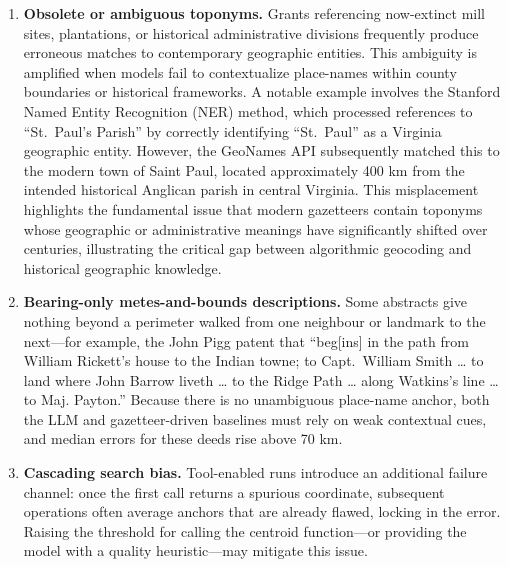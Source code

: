 \begin{enumerate}
\def\labelenumi{\arabic{enumi}.}
\item
  \textbf{Obsolete or ambiguous toponyms.} Grants referencing
  now-extinct mill sites, plantations, or historical administrative
  divisions frequently produce erroneous matches to contemporary
  geographic entities. This ambiguity is amplified when models fail to
  contextualize place-names within county boundaries or historical
  frameworks. A notable example involves the Stanford Named Entity
  Recognition (NER) method, which processed references to ``St.~Paul's
  Parish'' by correctly identifying ``St.~Paul'' as a Virginia
  geographic entity. However, the GeoNames API subsequently matched this
  to the modern town of Saint Paul, located approximately 400 km from
  the intended historical Anglican parish in central Virginia. This
  misplacement highlights the fundamental issue that modern gazetteers
  contain toponyms whose geographic or administrative meanings have
  significantly shifted over centuries, illustrating the critical gap
  between algorithmic geocoding and historical geographic knowledge.
\item
  \textbf{Bearing-only metes-and-bounds descriptions.} Some abstracts
  give nothing beyond a perimeter walked from one neighbour or landmark
  to the next---for example, the John Pigg patent that ``beg{[}ins{]} in
  the path from William Rickett's house to the Indian towne; to
  Capt.~William Smith \ldots{} to land where John Barrow liveth \ldots{}
  to the Ridge Path \ldots{} along Watkins's line \ldots{} to Maj.
  Payton.'' Because there is no unambiguous place-name anchor, both the
  LLM and gazetteer-driven baselines must rely on weak contextual cues,
  and median errors for these deeds rise above 70 km.
\item
  \textbf{Cascading search bias.} Tool-enabled runs introduce an
  additional failure channel: once the first \DIFdelbegin %
\DIFdelend \DIFaddbegin \texttt{}
  \DIFaddend call returns a spurious coordinate, subsequent
  \DIFdelbegin %
\DIFdelend \DIFaddbegin \texttt{} \DIFaddend operations often average anchors that are
  already flawed, locking in the error. Raising the threshold for
  calling the centroid function---or providing the model with a quality
  heuristic---may mitigate this issue.
\end{enumerate}

